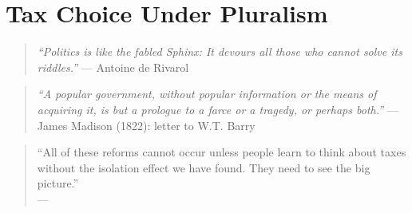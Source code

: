 
\chapter[Tax Choice Under Pluralism]{Tax Choice Under Pluralism} \label{chap:tax-under-pluralism}



\begin{quote}
	\emph{``Politics is like the fabled Sphinx: It devours all those who cannot solve its riddles.''}
	--- Antoine de Rivarol
\end{quote}

\begin{quote}
	\emph{``A popular government, without popular information or the means of acquiring it, is but a prologue to a farce or a tragedy, or perhaps both.''}
	--- James Madison (1822): letter to W.T. Barry
\end{quote}

\begin{quote}
	``All of these reforms cannot occur unless people learn to think about taxes without the isolation effect we have found. They need to see the big picture.''\\
	--- \cite[ 23]{McCaffery2003}
\end{quote}





